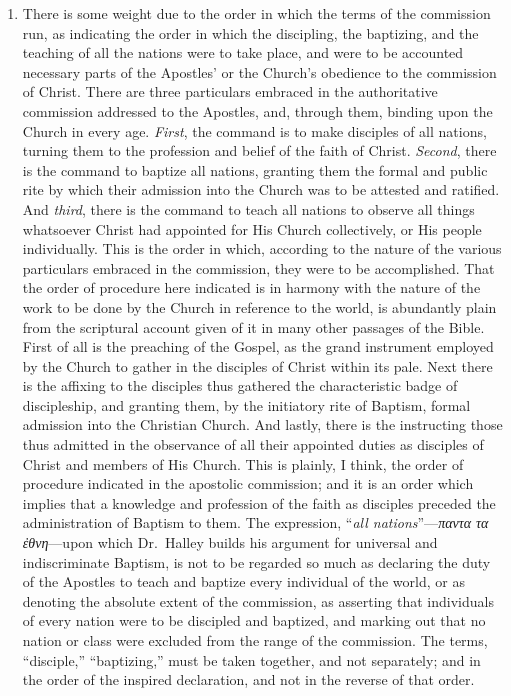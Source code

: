 \documentclass[english,]{book}
\begin{document}
\begin{enumerate}
\def\labelenumi{\arabic{enumi}.}
\item
  There is some weight due to the order in which the terms of the commission run, as indicating the order in which the discipling, the baptizing, and the teaching of all the nations were to take place, and were to be accounted necessary parts of the Apostles' or the Church's obedience to the commission of Christ. There are three particulars embraced in the authoritative commission addressed to the Apostles, and, through them, binding upon the Church in every age. \emph{First}, the command is to make disciples of all nations, turning them to the profession and belief of the faith of Christ. \emph{Second}, there is the command to baptize all nations, granting them the formal and public rite by which their admission into the Church was to be attested and ratified. And \emph{third}, there is the command to teach all nations to observe all things whatsoever Christ had appointed for His Church collectively, or His people individually. This is the order in which, according to the nature of the various particulars embraced in the commission, they were to be accomplished. That the order of procedure here indicated is in harmony with the nature of the work to be done by the Church in reference to the world, is abundantly plain from the scriptural account given of it in many other passages of the Bible. First of all is the preaching of the Gospel, as the grand instrument employed by the Church to gather in the disciples of Christ within its pale. Next there is the affixing to the disciples thus gathered the characteristic badge of discipleship, and granting them, by the initiatory rite of Baptism, formal admission into the Christian Church. And lastly, there is the instructing those thus admitted in the observance of all their appointed duties as disciples of Christ and members of His Church. This is plainly, I think, the order of procedure indicated in the apostolic commission; and it is an order which implies that a knowledge and profession of the faith as disciples preceded the administration of Baptism to them. The expression, ``\emph{all nations}''---\emph{παντα τα ἐθνη}---upon which Dr.~Halley builds his argument for universal and indiscriminate Baptism, is not to be regarded so much as declaring the duty of the Apostles to teach and baptize every individual of the world, or as denoting the absolute extent of the commission, as asserting that individuals of every nation were to be discipled and baptized, and marking out that no nation or class were excluded from the range of the commission. The terms, ``disciple,'' ``baptizing,'' must be taken together, and not separately; and in the order of the inspired declaration, and not in the reverse of that order.

\end{enumerate}
\end{document}
